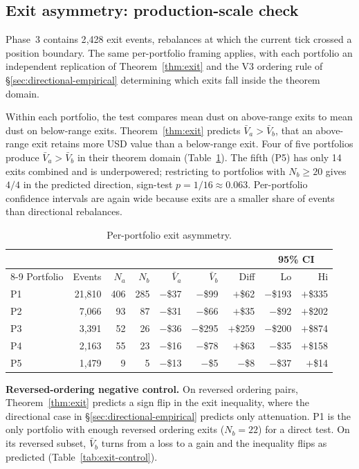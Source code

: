 \documentclass{manuscript}
\begin{document}
\subsection{Exit asymmetry: production-scale check}\label{sec:exit-empirical}

Phase~3 contains 2{,}428 exit events, rebalances at which the current tick crossed a position boundary. The same per-portfolio framing applies, with each portfolio an independent replication of Theorem~\ref{thm:exit} and the V3 ordering rule of \S\ref{sec:directional-empirical} determining which exits fall inside the theorem domain.

Within each portfolio, the test compares mean dust on above-range exits to mean dust on below-range exits. Theorem~\ref{thm:exit} predicts $\bar V_a > \bar V_b$, that an above-range exit retains more USD value than a below-range exit. Four of five portfolios produce $\bar V_a > \bar V_b$ in their theorem domain (Table~\ref{tab:exit-phase3}). The fifth (P5) has only 14 exits combined and is underpowered; restricting to portfolios with $N_b \geq 20$ gives $4/4$ in the predicted direction, sign-test $p = 1/16 \approx 0.063$. Per-portfolio confidence intervals are again wide because exits are a smaller share of events than directional rebalances.

\begin{table}[H]
\centering
\caption{Per-portfolio exit asymmetry.}
\label{tab:exit-phase3}
\begin{tabular}{@{}lrrrrrrrr@{}}
\toprule
 & & & & & & & \multicolumn{2}{c}{95\% CI} \\
\cmidrule(lr){8-9}
Portfolio & Events & $N_a$ & $N_b$ & $\bar V_a$ & $\bar V_b$ & Diff & Lo & Hi \\
\midrule
P1 & 21{,}810 & 406 & 285 & $-$\$37  & $-$\$99  & $+$\$62  & $-$\$193 & $+$\$335 \\
P2 & 7{,}066  & 93  & 87  & $-$\$31  & $-$\$66  & $+$\$35  & $-$\$92  & $+$\$202 \\
P3 & 3{,}391  & 52  & 26  & $-$\$36  & $-$\$295 & $+$\$259 & $-$\$200 & $+$\$874 \\
P4 & 2{,}163  & 55  & 23  & $-$\$16  & $-$\$78  & $+$\$63  & $-$\$35  & $+$\$158 \\
P5 & 1{,}479  & 9   & 5   & $-$\$13  & $-$\$5   & $-$\$8   & $-$\$37  & $+$\$14  \\
\bottomrule
\end{tabular}
\end{table}

\noindent\textbf{Reversed-ordering negative control.} On reversed ordering pairs, Theorem~\ref{thm:exit} predicts a sign flip in the exit inequality, where the directional case in \S\ref{sec:directional-empirical} predicts only attenuation. P1 is the only portfolio with enough reversed ordering exits ($N_b = 22$) for a direct test. On its reversed subset, $\bar V_b$ turns from a loss to a gain and the inequality flips as predicted (Table~\ref{tab:exit-control}).
\end{document}
